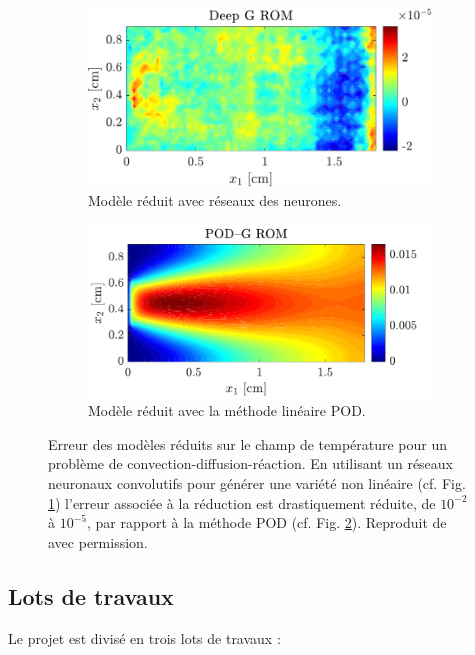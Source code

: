 \documentclass[12pt, french]{article}
\begin{document}
\begin{figure}[t]
	
	\begin{subfigure}[t]{0.465\textwidth}
		\includegraphics[width=\columnwidth]{DGROM_T_param1.pdf} 
		\caption{Modèle réduit avec réseaux des neurones.}
		\label{fig:DG_ROM}
	\end{subfigure}\hfill
	\begin{subfigure}[t]{0.48\textwidth}
		\includegraphics[width=\columnwidth]{GROM_T_param1.pdf}%
		\caption{Modèle réduit avec la méthode linéaire POD.}
		\label{fig:POD_ROM}
	\end{subfigure}
	\caption[]{Erreur des modèles réduits sur le champ de température pour un problème de convection-diffusion-réaction. En utilisant un réseaux neuronaux convolutifs pour générer une variété non linéaire (cf. Fig. \ref{fig:DG_ROM}) l'erreur associée à la réduction  est drastiquement réduite, de $10^{-2}$ à $10^{-5}$, par rapport à la méthode POD (cf. Fig. \ref{fig:POD_ROM}). Reproduit de \cite{lee2020} avec permission.}%
	\label{fig:deepROM}%
\end{figure}


\subsection{Lots de travaux}
Le projet est divisé en trois lots de travaux :
\end{document}
